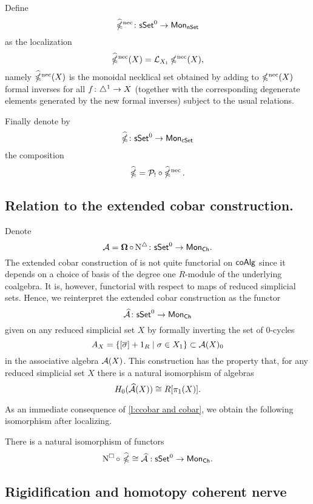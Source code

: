 Define 
$$\operatorname{\widehat{\mathbb{\Omega}}^{\mathrm{nec}}} \colon \mathsf{sSet}^0 \to \mathsf{Mon}_{\mathsf{nSet}}$$
as the localization
$$\operatorname{\widehat{\mathbb{\Omega}}^{\mathrm{nec}}}(X)= \mathcal{L}_{X_1} \operatorname{\mathbb{\Omega}^{\mathrm{nec}}}(X),$$
namely $\operatorname{\widehat{\mathbb{\Omega}}^{\mathrm{nec}}}(X)$ is the monoidal necklical set obtained by adding to $\operatorname{\mathbb{\Omega}^{\mathrm{nec}}}(X)$  formal inverses for all $f\colon \triangle^1 \to X$ (together with the corresponding degenerate elements generated by the new formal inverses) subject to the usual relations.

Finally denote by
$$\widehat{\operatorname{\mathbb{\Omega}}} \colon \mathsf{sSet}^0 \to \mathsf{Mon}_{\mathsf{cSet}}$$
the composition
$$\widehat{\operatorname{\mathbb{\Omega}}}= \mathcal{P}_{!} \circ \operatorname{\widehat{\mathbb{\Omega}}^{\mathrm{nec}}}.$$

\subsection{Relation to the extended cobar construction.}

Denote
$$\operatorname{\mathcal{A}} = \operatorname{\mathbf{\Omega}} \circ \operatorname{N^{\triangle}} \colon \mathsf{sSet}^0 \to \mathsf{Mon}_{\mathsf{Ch}}.$$
The extended cobar construction of \cite{hess2010cobar} is not quite functorial on $\mathsf{coAlg}$ since it depends on a choice of basis of the degree one $R$-module of the underlying coalgebra.
It is, however, functorial with respect to maps of reduced simplicial sets.
Hence, we reinterpret the extended cobar construction as the functor
\begin{equation*}
\operatorname{\mathcal{\widehat{A}}} \colon \mathsf{sSet}^0 \to \mathsf{Mon}_{\mathsf{Ch}}
\end{equation*}
given on any reduced simplicial set $X$ by formally inverting the set of $0$-cycles
\begin{equation*}
A_X = \{ [\overline{\sigma}]+1_R \mid \sigma \in X_1 \} \subset \operatorname{\mathcal{A}}(X)_0
\end{equation*}
in the associative algebra $\operatorname{\mathcal{A}}(X)$.
This construction has the property that, for any reduced simplicial set $X$ there is a natural isomorphism of algebras
\begin{equation*}
H_0(\operatorname{\mathcal{\widehat{A}}}(X)) \cong R[\pi_1(X)].
\end{equation*}

As an immediate consequence of \cref{l:ccobar and cobar}, we obtain the following isomorphism after localizing.

\begin{corollary}
	There is a natural isomorphism of functors
	$$\operatorname{N^{\square}} \circ\ \widehat{\operatorname{\mathbb{\Omega}}} \cong \operatorname{\mathcal{\widehat{A}}} :\mathsf{sSet}^0 \to \mathsf{Mon}_{\mathsf{Ch}}.$$
\end{corollary}

\subsection{Rigidification and homotopy coherent nerve}

